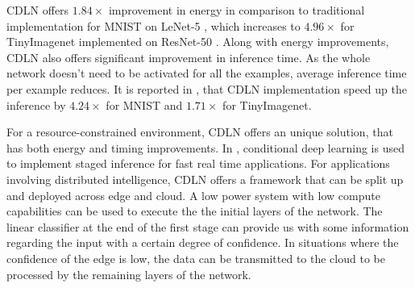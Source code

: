 CDLN \cite{panda2017energy} offers $1.84\times$ improvement in energy in comparison to traditional implementation for MNIST on LeNet-5 \cite{lecun1998gradient}, which increases to $4.96\times$ for TinyImagenet implemented on ResNet-50 \cite{he2016deep}. Along with energy improvements, CDLN also offers significant improvement in inference time. As the whole network doesn't need to be activated for all the examples, average inference time per example reduces. It is reported in \cite{panda2017energy}, that CDLN implementation speed up the inference by $4.24\times$ for MNIST and $1.71\times$ for TinyImagenet. 

For a resource-constrained environment, CDLN offers an unique solution, that has both energy and timing improvements. In \cite{parsa2017staged}, conditional deep learning is used to implement staged inference for fast real time applications. For applications involving distributed intelligence, CDLN offers a framework that can be split up and deployed across edge and cloud. A low power system with low compute capabilities can be used to execute the the initial layers of the network. The linear classifier at the end of the first stage can provide us with some information regarding the input with a certain degree of confidence. In situations where the confidence of the edge is low, the data can be transmitted to the cloud to be processed by the remaining layers of the network. 













